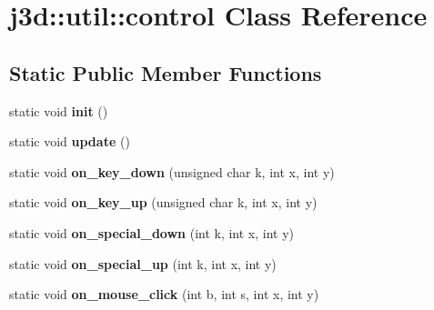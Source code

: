 \hypertarget{classj3d_1_1util_1_1control}{}\section{j3d\+:\+:util\+:\+:control Class Reference}
\label{classj3d_1_1util_1_1control}
\subsection*{Static Public Member Functions}
\begin{DoxyCompactItemize}
\item 
\hypertarget{classj3d_1_1util_1_1control_ae0d5a3ff2b8996008cf8fb2edc59b792}{}static void {\bfseries init} ()\label{classj3d_1_1util_1_1control_ae0d5a3ff2b8996008cf8fb2edc59b792}

\item 
\hypertarget{classj3d_1_1util_1_1control_a1132c4adfea16e810e41a879c3452d34}{}static void {\bfseries update} ()\label{classj3d_1_1util_1_1control_a1132c4adfea16e810e41a879c3452d34}

\item 
\hypertarget{classj3d_1_1util_1_1control_a735d2f9044a9d39e4473909b3c1fde2c}{}static void {\bfseries on\+\_\+key\+\_\+down} (unsigned char k, int x, int y)\label{classj3d_1_1util_1_1control_a735d2f9044a9d39e4473909b3c1fde2c}

\item 
\hypertarget{classj3d_1_1util_1_1control_a99e0a79b62a2a811ba088ecbd13fd3e8}{}static void {\bfseries on\+\_\+key\+\_\+up} (unsigned char k, int x, int y)\label{classj3d_1_1util_1_1control_a99e0a79b62a2a811ba088ecbd13fd3e8}

\item 
\hypertarget{classj3d_1_1util_1_1control_af4136da90458b87664563f18d9917aa6}{}static void {\bfseries on\+\_\+special\+\_\+down} (int k, int x, int y)\label{classj3d_1_1util_1_1control_af4136da90458b87664563f18d9917aa6}

\item 
\hypertarget{classj3d_1_1util_1_1control_ad933332c37105d938c8292f818229cfe}{}static void {\bfseries on\+\_\+special\+\_\+up} (int k, int x, int y)\label{classj3d_1_1util_1_1control_ad933332c37105d938c8292f818229cfe}

\item 
\hypertarget{classj3d_1_1util_1_1control_a18670fd8b0f6663c0c014cd7660326c0}{}static void {\bfseries on\+\_\+mouse\+\_\+click} (int b, int s, int x, int y)\label{classj3d_1_1util_1_1control_a18670fd8b0f6663c0c014cd7660326c0}


\end{DoxyCompactItemize}
